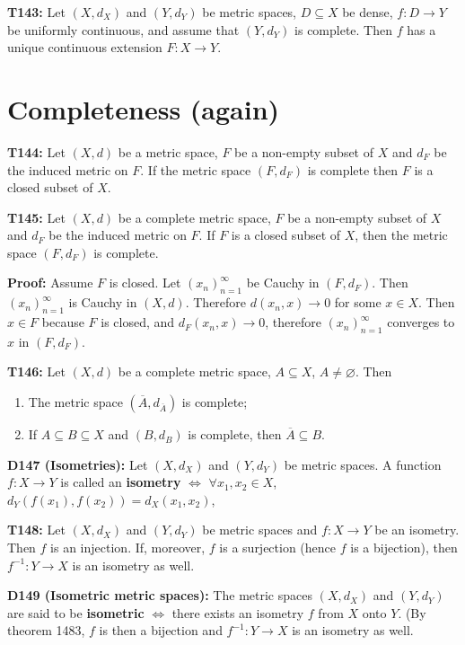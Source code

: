 \documentclass[twocolumn,10pt]{article}
\begin{document}
\textbf{T143:} Let $(X,d_X)$ and $(Y,d_Y)$ be metric spaces, $D\subseteq X$ be dense, $f:D\to Y$ be uniformly continuous, and assume that $(Y,d_Y)$ is complete. Then $f$ has a unique continuous extension $F:X\to Y$.

\section{Completeness (again)}

\textbf{T144:} Let $(X,d)$ be a metric space, $F$ be a non-empty subset of $X$ and $d_F$ be the induced metric on $F$. If the metric space $(F,d_F)$ is complete then $F$ is a closed subset of $X$.

\textbf{T145:} Let $(X,d)$ be a complete metric space, $F$ be a non-empty subset of $X$ and $d_F$ be the induced metric on $F$. If $F$ is a closed subset of $X$, then the metric space $(F,d_F)$ is complete.

\color{red}
\textbf{Proof:} Assume $F$ is closed. Let $(x_n)_{n=1}^{\infty}$ be Cauchy in $(F,d_F)$. Then $(x_n)_{n=1}^{\infty}$ is Cauchy in $(X,d)$. Therefore $d(x_n,x)\to0$ for some $x\in X$. Then $x\in F$ because $F$ is closed, and $d_F(x_n,x)\to0$, therefore $(x_n)_{n=1}^{\infty}$ converges to $x$ in $(F,d_F)$.
\color{black}

\textbf{T146:} Let $(X,d)$ be a complete metric space, $A\subseteq X$, $A\neq\varnothing$. Then
\begin{enumerate}
    \item The metric space $(\overline{A},d_{\overline{A}})$ is complete;
    \item If $A\subseteq B\subseteq X$ and $(B,d_B)$ is complete, then $\overline{A}\subseteq B$.
\end{enumerate}
\textbf{D147 (Isometries):} Let $(X,d_X)$ and $(Y,d_Y)$ be metric spaces. A function $f:X\to Y$ is called an \textbf{isometry} $\Leftrightarrow$ $\forall x_1,x_2\in X$, $d_Y(f(x_1),f(x_2))=d_X(x_1,x_2)$,

\textbf{T148:} Let $(X,d_X)$ and $(Y,d_Y)$ be metric spaces and $f:X\to Y$ be an isometry. Then $f$ is an injection. If, moreover, $f$ is a surjection (hence $f$ is a bijection), then $f^{-1}:Y\to X$ is an isometry as well.

\textbf{D149 (Isometric metric spaces):} The metric spaces $(X,d_X)$ and $(Y,d_Y)$ are said to be \textbf{isometric} $\Leftrightarrow$ there exists an isometry $f$ from $X$ onto $Y$. (By theorem 1483, $f$ is then a bijection and $f^{-1}:Y\to X$ is an isometry as well.
\end{document}
